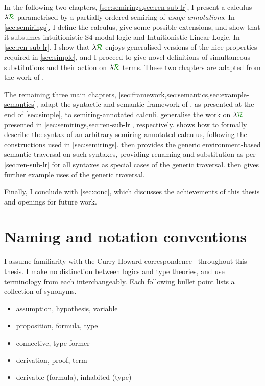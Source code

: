 In the following two chapters, \cref{sec:semirings,sec:ren-sub-lr}, I present a
calculus $\name$ parametrised by a partially ordered semiring of \emph{usage
annotations}.
In \cref{sec:semirings}, I define the calculus, give some possible extensions,
and show that it subsumes intuitionistic S4 modal logic and Intuitionistic
Linear Logic.
In \cref{sec:ren-sub-lr}, I show that $\name$ enjoys generalised versions of the
nice properties required in \cref{sec:simple}, and I proceed to give novel
definitions of simultaneous substitutions and their action on $\name$ terms.
These two chapters are adapted from the work of \citet{WA21}.

The remaining three main chapters,
\cref{sec:framework,sec:semantics,sec:example-semantics}, adapt the syntactic
and semantic framework of \citet{AACMM21}, as presented at the end of
\cref{sec:simple}, to semiring-annotated calculi.
 generalise the work on $\name$ presented in
\cref{sec:semirings,sec:ren-sub-lr}, respectively.
 shows how to formally describe the syntax of an arbitrary
semiring-annotated calculus, following the constructions used in
\cref{sec:semirings}.
 then provides the generic environment-based semantic
traversal on such syntaxes, providing renaming and substitution as per
\cref{sec:ren-sub-lr} for all syntaxes as special cases of the generic
traversal.
 then gives further example uses of the generic
traversal.

Finally, I conclude with \cref{sec:conc}, which discusses the achievements of
this thesis and openings for future work.

\section{Naming and notation conventions}

I assume familiarity with the Curry-Howard correspondence~\citep{Howard80}
throughout this thesis.
I make no distinction between logics and type theories, and use terminology from
each interchangeably.
Each following bullet point lists a collection of synonyms.

\begin{itemize}
  \item assumption, hypothesis, variable
  \item proposition, formula, type
  \item connective, type former
  \item derivation, proof, term
  \item derivable (formula), inhabited (type)
\end{itemize}


